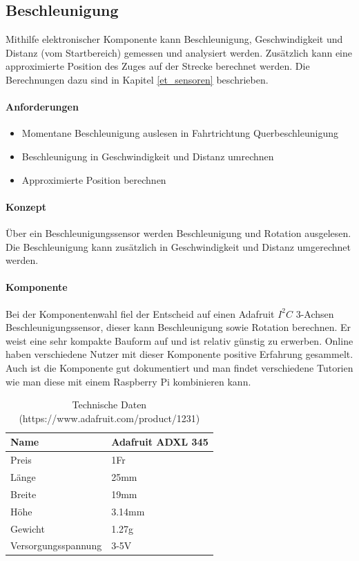 \documentclass[../../main.tex]{subfiles}
\begin{document}
\subsection{Beschleunigung} \label{pi_beschleunigung}
Mithilfe elektronischer Komponente kann Beschleunigung, Geschwindigkeit und Distanz (vom Startbereich) gemessen und analysiert werden. Zusätzlich kann eine approximierte Position des Zuges auf der Strecke berechnet werden. Die Berechnungen dazu sind in Kapitel \ref{et_sensoren} beschrieben.

\paragraph{Anforderungen}
\begin{itemize}
    \item Momentane Beschleunigung auslesen
      \subitem in Fahrtrichtung
      \subitem Querbeschleunigung
    \item Beschleunigung in Geschwindigkeit und Distanz umrechnen
    \item Approximierte Position berechnen
\end{itemize}

\paragraph{Konzept}
Über ein Beschleunigungssensor werden Beschleunigung und Rotation ausgelesen. Die Beschleunigung kann zusätzlich in Geschwindigkeit und Distanz umgerechnet werden.

\paragraph{Komponente}
Bei der Komponentenwahl fiel der Entscheid auf einen Adafruit $I^2C$ 3-Achsen Beschleunigungssensor, dieser kann Beschleunigung sowie Rotation berechnen. Er weist eine sehr kompakte Bauform auf und ist relativ günstig zu erwerben. Online haben verschiedene Nutzer mit dieser Komponente positive Erfahrung gesammelt. Auch ist die Komponente gut dokumentiert und man findet verschiedene Tutorien wie man diese mit einem Raspberry Pi kombinieren kann.

\begin{table}[H]
\begin{center}
\begin{tabular}{ll}
Name & Adafruit ADXL 345  \\ \hline
Preis & 1Fr               \\ \hline
Länge & 25mm              \\ \hline
Breite & 19mm             \\ \hline
Höhe & 3.14mm             \\ \hline
Gewicht & 1.27g           \\ \hline
Versorgungsspannung & 3-5V \\ \hline
\end{tabular}
\caption {Technische Daten (https://www.adafruit.com/product/1231)}
\end{center}
\end{table}
\end{document}
